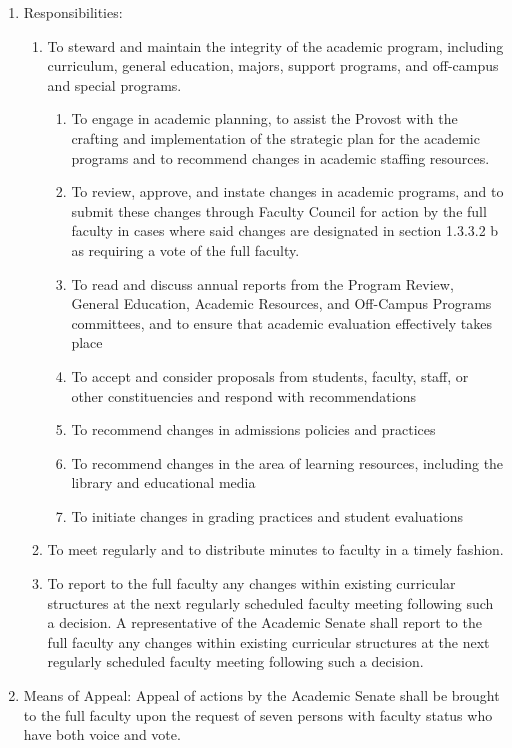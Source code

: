 \documentclass[letterpaper, 11pt]{article}
\begin{document}
\begin{enumerate}[label=\alph*)]
{						}
						\item{Responsibilities:
							\begin{enumerate}[label=\arabic*)]
								\item{To steward and maintain the integrity of the academic program, including curriculum, general education, majors, support programs, and off-campus and special programs.
									\begin{enumerate}[label=(\alph*)]
										\item{To engage in academic planning, to assist the Provost with the crafting and implementation of the strategic plan for the academic programs and to recommend changes in academic staffing resources.}
										\item{To review, approve, and instate changes in academic programs, and to submit these changes through Faculty Council for action by the full faculty in cases where said changes are designated in section 1.3.3.2 b as requiring a vote of the full faculty.}
										\item{To read and discuss annual reports from the Program Review, General Education, Academic Resources, and Off-Campus Programs committees, and to ensure that academic evaluation effectively takes place}
										\item{To accept and consider proposals from students, faculty, staff, or other constituencies and respond with recommendations}
										\item{To recommend changes in admissions policies and practices}
										\item{To recommend changes in the area of learning resources, including the library and educational media}
										\item{To initiate changes in grading practices and student evaluations}
									\end{enumerate}
								}
								\item{To meet regularly and to distribute minutes to faculty in a timely fashion.}
								\item{To report to the full faculty any changes within existing curricular structures at the next regularly scheduled faculty meeting following such a decision. A representative of the Academic Senate shall report to the full faculty any changes within existing curricular structures at the next regularly scheduled faculty meeting following such a decision.}
							\end{enumerate}
						}
						\item{Means of Appeal:  Appeal of actions by the Academic Senate shall be brought to the full faculty upon the request of seven persons with faculty status who have both voice and vote.}

\end{enumerate}
\end{document}
